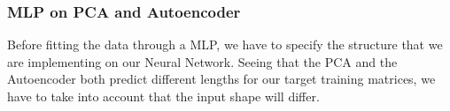 



\subsubsection{	MLP on PCA and Autoencoder}

Before fitting the data through a MLP, we have to specify the structure that we are implementing on our Neural Network. Seeing that the PCA and the Autoencoder both predict different lengths for our target training matrices, we have to take into account that the input shape will differ. \par

